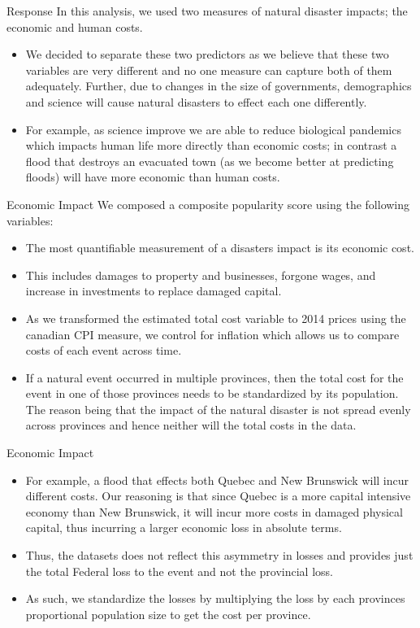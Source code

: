 \begin{frame}{Response}
	In this analysis, we used two measures of natural disaster impacts; the economic and human costs.
\begin{itemize}
	\item We decided to separate these two predictors as we believe that these two variables are very different and no one measure can capture both of them adequately. Further, due to changes in the size of governments, demographics and science will cause natural disasters to effect each one differently. 
	\item For example, as science improve we are able to reduce biological pandemics which impacts human life more directly than economic costs; in contrast a flood that destroys an evacuated town (as we become better at predicting floods) will have more economic than human costs.

\end{itemize}
\end{frame}

\begin{frame}{Economic Impact}
We composed a composite popularity score using the following variables:
\begin{itemize}
\item The most quantifiable measurement of a disasters impact is its economic cost.
\item This includes damages to property and businesses, forgone wages, and increase in investments to replace damaged capital.
\item  As we transformed the estimated total cost variable to 2014 prices using the canadian CPI measure, we control for inflation which allows us to compare costs of each event across time.
\item If a natural event occurred in multiple provinces, then the total cost for the event in one of those provinces needs to be standardized by its population. The reason being that the impact of the natural disaster is not spread evenly across provinces and hence neither will the total costs in the data.

\end{itemize}
\end{frame}

\begin{frame}{Economic Impact}
\begin{itemize}
	\item For example, a flood that effects both Quebec and New Brunswick will incur different costs. Our reasoning is that since Quebec is a more capital intensive economy than New Brunswick, it will incur more costs in damaged physical capital, thus incurring a larger economic loss in absolute terms.
	\item Thus, the datasets does not reflect this asymmetry in losses and provides just the total Federal loss to the event and not the provincial loss.
	\item As such, we standardize the losses by multiplying the loss by each provinces proportional population size to get the cost per province.
\end{itemize}
\end{frame}

